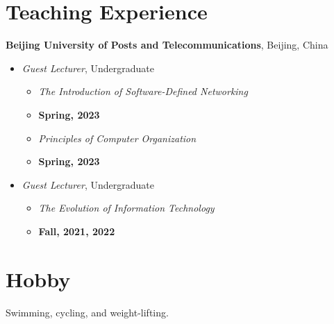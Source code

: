 \documentclass[letterpaper,11pt]{article}
\newcommand{\contentlength}{5.5in}
\begin{document}
	\section{\textbf{Teaching Experience}}
	\begin{tcolorbox}[flush right,breakable,colback=white,colframe=white,width=\contentlength]
		\textbf{Beijing University of Posts and Telecommunications}, Beijing, China
		\begin{itemize}[itemsep=0mm]
			\item \textit{Guest Lecturer}, Undergraduate 
			\begin{itemize}[itemsep=0mm]
				\item \textit{The Introduction of Software-Defined Networking}
				\item \textbf{Spring, 2023}
				\item \textit{Principles of Computer Organization}
				\item \textbf{Spring, 2023}
			\end{itemize}
	
			\item \textit{Guest Lecturer}, Undergraduate 
			\begin{itemize}[itemsep=0mm]
				\item \textit{The Evolution of Information Technology}	
				\item \textbf{Fall, 2021, 2022}
			\end{itemize}
		\end{itemize}
	\end{tcolorbox}
	
	
	
	\section{\textbf{Hobby}}
	\begin{tcolorbox}[flush right,breakable,colback=white,colframe=white,width=\contentlength]
		Swimming, cycling, and weight-lifting.
		
	\end{tcolorbox}
	
	
	
\end{document}
